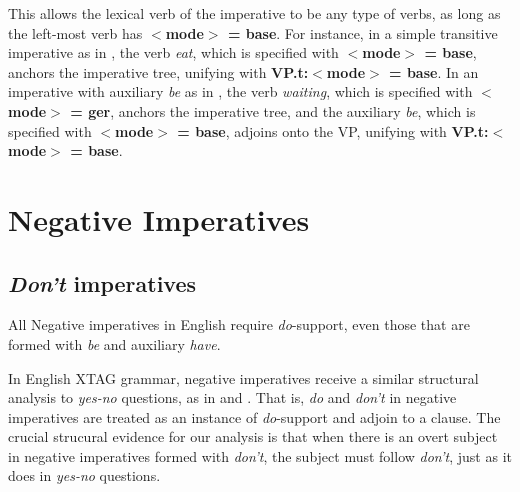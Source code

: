 
This allows the lexical verb of the imperative to be any type of verbs, as
long as the left-most verb has {\bf $<$mode$>$ = base}.  For instance, in a
simple transitive imperative as in , the verb {\it eat}, which is
specified with {\bf $<$mode$>$ = base}, anchors the imperative tree,
unifying with {\bf VP.t:$<$mode$>$ = base}.  In an imperative with
auxiliary {\it be} as in , the verb {\it waiting}, which is specified
with {\bf $<$mode$>$ = ger}, anchors the imperative tree, and the auxiliary
{\it be}, which is specified with {\bf $<$mode$>$ = base}, adjoins onto the
VP, unifying with {\bf VP.t:$<$mode$>$ = base}.



\section{Negative Imperatives}
\label{neg-imp}

\subsection{{\it Don't} imperatives}

All Negative imperatives in English require {\it do}-support, even those
that are formed with {\it be} and auxiliary {\it have}.





In English XTAG grammar, negative imperatives receive a similar structural analysis
to {\it yes-no} questions, as in \cite{potsdamdiss97} and \cite{handiss}.
That is, {\it do} and {\it don't} in negative imperatives are treated as an
instance of {\it do}-support and adjoin to a clause.  The crucial
strucural evidence for our analysis is that when there is an overt subject
in negative imperatives formed with {\it don't}, the subject must follow
{\it don't}, just as it does in {\it yes-no} questions.



